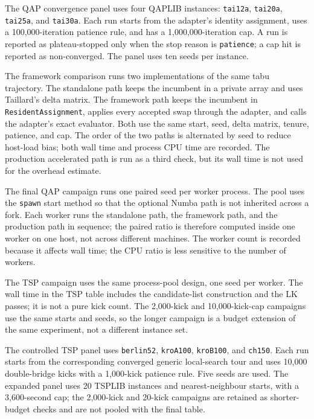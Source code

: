 \documentclass[11pt]{article}
\begin{document}
The QAP convergence panel uses four QAPLIB instances: \texttt{tai12a}, \texttt{tai20a},
\texttt{tai25a}, and \texttt{tai30a}. Each run starts from the adapter's identity assignment, uses a
100,000-iteration patience rule, and has a 1,000,000-iteration cap. A run is reported as
plateau-stopped only when the stop reason is \texttt{patience}; a cap hit is reported as
non-converged. The panel uses ten seeds per instance.

The framework comparison runs two implementations of the same tabu trajectory. The standalone path
keeps the incumbent in a private array and uses Taillard's delta matrix. The framework path keeps the
incumbent in \texttt{ResidentAssignment}, applies every accepted swap through the adapter, and calls
the adapter's exact evaluator. Both use the same start, seed, delta matrix, tenure, patience, and cap.
The order of the two paths is alternated by seed to reduce host-load bias; both wall time and process
CPU time are recorded. The production accelerated path is run as a third check, but its wall time is
not used for the overhead estimate.

The final QAP campaign runs one paired seed per worker process. The pool uses the \texttt{spawn}
start method so that the optional Numba path is not inherited across a fork. Each worker runs the
standalone path, the framework path, and the production path in sequence; the paired ratio is
therefore computed inside one worker on one host, not across different machines. The worker count is
recorded because it affects wall time; the CPU ratio is less sensitive to the number of workers.

The TSP campaign uses the same process-pool design, one seed per worker. The wall time in the TSP
table includes the candidate-list construction and the LK passes; it is not a pure kick count. The
2,000-kick and 10,000-kick-cap campaigns use the same starts and seeds, so the longer campaign is a budget
extension of the same experiment, not a different instance set.

The controlled TSP panel uses \texttt{berlin52}, \texttt{kroA100}, \texttt{kroB100}, and
\texttt{ch150}. Each run starts from the corresponding converged generic local-search tour and uses
10,000 double-bridge kicks with a 1,000-kick patience rule. Five seeds are used. The expanded panel
uses 20 TSPLIB instances and nearest-neighbour starts, with a 3,600-second cap; the 2,000-kick and
20-kick campaigns are retained as shorter-budget checks and are not pooled with the final table.
\end{document}
